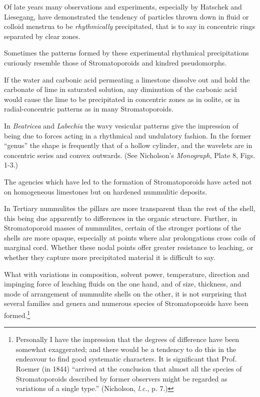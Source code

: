 \documentclass[a4paper, 12pt, oneside, landscape]{article}
\begin{document}
Of late years many observations and experiments, especially by Hatschek and Liesegang, have demonstrated the tendency of particles thrown down in fluid or colloid menstrua to be \emph{rhythmically} precipitated, that is to say in concentric rings separated by clear zones.

Sometimes the patterns formed by these experimental rhythmical precipitations curiously resemble those of Stromatoporoids and kindred pseudomorphs.

If the water and carbonic acid permeating a limestone dissolve out and hold the carbonate of lime in saturated solution, any diminution of the carbonic acid would cause the lime to be precipitated in concentric zones as in oolite, or in radial-concentric patterns as in many Stromatoporoids.

In \emph{Beatricea} and \emph{Labechia} the wavy vesicular patterns give the impression of being due to forces acting in a rhythmical and undulatory fashion. In the former ``genus'' the shape is frequently that of a hollow cylinder, and the wavelets are in concentric series and convex outwards. (See Nicholson's \emph{Monograph}, Plate 8, Figs. 1-3.)

The agencies which have led to the formation of Stromatoporoids have acted not on homogeneous limestones but on hardened nummulitic deposits.

In Tertiary nummulites the pillars are more transparent than the rest of the shell, this being due apparently to differences in the organic structure. Further, in Stromatoporoid masses of nummulites, certain of the stronger portions of the shells are more opaque, especially at points where alar prolongations cross coils of marginal cord. Whether these nodal points offer greater resistance to leaching, or whether they capture more precipitated material it is difficult to say.

What with variations in composition, solvent power, temperature, direction and impinging force of leaching fluids on the one hand, and of size, thickness, and mode of arrangement of nummulite shells on the other, it is not surprising that several families and genera and numerous species of Stromatoporoids have been formed.\footnote{Personally I have the impression that the degrees of difference have been somewhat exaggerated; and there would be a tendency to do this in the endeavour to find good systematic characters. It is significant that Prof. Roemer (in 1844) ``arrived at the conclusion that almost all the species of Stromatoporoids described by former observers might be regarded as variations of a single type.'' (Nicholson, \emph{l.c.}, p. 7.)}
\end{document}
